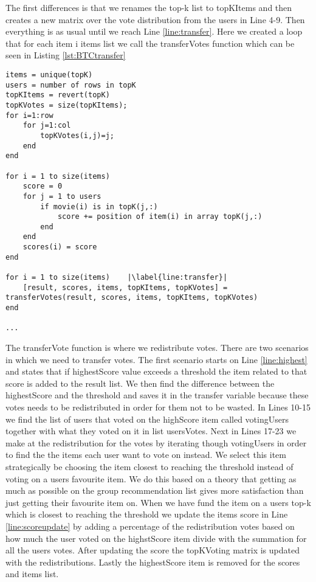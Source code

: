 The first differences is that we renames the top-k list to topKItems and then creates a new matrix over the vote distribution from the users in Line 4-9. Then everything is as usual until we reach Line \ref{line:transfer}. Here we created a loop that for each item i items list we call the transferVotes function which can be seen in Listing \ref{lst:BTCtransfer}


\begin{lstlisting}[caption={Borda transferable count implementation},label=lst:BTC]
items = unique(topK)
users = number of rows in topK
topKItems = revert(topK)
topKVotes = size(topKItems);
for i=1:row
    for j=1:col
        topKVotes(i,j)=j;
    end 
end

for i = 1 to size(items)
	score = 0
	for j = 1 to users
		if movie(i) is in topK(j,:)
			score += position of item(i) in array topK(j,:)
		end
	end
	scores(i) = score
end

for i = 1 to size(items)	|\label{line:transfer}|
	[result, scores, items, topKItems, topKVotes] = transferVotes(result, scores, items, topKItems, topKVotes)
end
	
...
\end{lstlisting}

The transferVote function is where we redistribute votes. There are two scenarios in which we need to transfer votes. The first scenario starts on Line \ref{line:highest} and states that if highestScore value exceeds a threshold the item related to that score is added to the result list. We then find the difference between the highestScore and the threshold and saves it in the transfer variable because these votes needs to be redistributed in order for them not to be wasted. In Lines 10-15 we find the list of users that voted on the highScore item  called votingUsers together with what they voted on it in list usersVotes. Next in Lines 17-23 we make at the redistribution for the votes by iterating though votingUsers in order to find the the items each user want to vote on instead. We select this item strategically be choosing the item closest to reaching the threshold instead of voting on a users favourite item. We do this based on a theory that getting as much as possible on the group recommendation list gives more satisfaction than just getting their favourite item on. When we have fund the item on a users top-k which is closest to reaching the threshold we update the items score in Line \ref{line:scoreupdate} by adding a percentage of the redistribution votes based on how much the user voted on the highstScore item divide with the summation for all the users votes. After updating the score the topKVoting matrix is updated with the redistributions. Lastly the highestScore item is removed for the scores and items list. 

